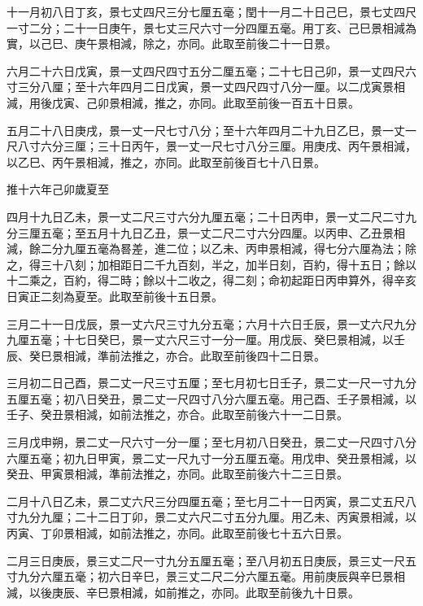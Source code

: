 \begin{pinyinscope}
 十一月初八日丁亥，景七丈四尺三分七厘五毫；閏十一月二十日己巳，景七丈四尺一寸二分；二十一日庚午，景七丈三尺六寸一分四厘五毫。用丁亥、己巳景相減為實，以己巳、庚午景相減，除之，亦同。此取至前後二十一日景。



 六月二十六日戊寅，景一丈四尺四寸五分二厘五毫；二十七日己卯，景一丈四尺六寸三分八厘；至十六年四月二日戊寅，景一丈四尺四寸八分一厘。以二戊寅景相減，用後戊寅、己卯景相減，推之，亦同。此取至前後一百五十日景。



 五月二十八日庚戌，景一丈一尺七寸八分；至十六年四月二十九日乙巳，景一丈一尺八寸六分三厘；三十日丙午，景一丈一尺七寸八分三厘。用庚戌、丙午景相減，以乙巳、丙午景相減，推之，亦同。此取至前後百七十八日景。



 推十六年己卯歲夏至



 四月十九日乙未，景一丈二尺三寸六分九厘五毫；二十日丙申，景一丈二尺二寸九分三厘五毫；至五月十九日乙丑，景一丈二尺二寸六分四厘。以丙申、乙丑景相減，餘二分九厘五毫為晷差，進二位；以乙未、丙申景相減，得七分六厘為法；除之，得三十八刻；加相距日二千九百刻，半之，加半日刻，百約，得十五日；餘以十二乘之，百約，得二時；餘以十二收之，得二刻；命初起距日丙申算外，得辛亥日寅正二刻為夏至。此取至前後十五日景。



 三月二十一日戊辰，景一丈六尺三寸九分五毫；六月十六日壬辰，景一丈六尺九分九厘五毫；十七日癸巳，景一丈六尺三寸一分一厘。用戊辰、癸巳景相減，以壬辰、癸巳景相減，準前法推之，亦合。此取至前後四十二日景。



 三月初二日己酉，景二丈一尺三寸五厘；至七月初七日壬子，景二丈一尺一寸九分五厘五毫；初八日癸丑，景二丈一尺四寸八分六厘五毫。用己酉、壬子景相減，以壬子、癸丑景相減，如前法推之，亦合。此取至前後六十一二日景。



 三月戊申朔，景二丈一尺六寸一分一厘；至七月初八日癸丑，景二丈一尺四寸八分六厘五毫；初九日甲寅，景二丈一尺九寸一分五厘五毫。用戊申、癸丑景相減，以癸丑、甲寅景相減，準前法推之，亦同。此取至前後六十二三日景。



 二月十八日乙未，景二丈六尺三分四厘五毫；至七月二十一日丙寅，景二丈五尺八寸九分九厘；二十二日丁卯，景二丈六尺二寸五分九厘。用乙未、丙寅景相減，以丙寅、丁卯景相減，如前法推之，亦同。此取至前後七十五六日景。



 二月三日庚辰，景三丈二尺一寸九分五厘五毫；至八月初五日庚辰，景三丈一尺五寸九分六厘五毫；初六日辛巳，景三丈二尺二分六厘五毫。用前庚辰與辛巳景相減，以後庚辰、辛巳景相減，如前推之，亦同。此取至前後九十日景。




\end{pinyinscope}
